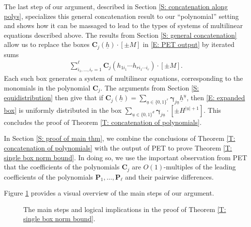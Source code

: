 \documentclass[11pt]{amsart}
\theoremstyle{definition}
\newcommand{\bc}{{\textbf{C}}}
\newcommand{\bp}{{\textbf{P}}}
\newcommand{\bgamma}{{\boldsymbol{\gamma}}}
\newcommand{\uh}{{\underline{h}}}
\newcommand{\uu}{{\underline{u}}}
\begin{document}
The last step of our argument, described in Section \ref{S: concatenation along polys}, specializes this general concatenation result to our ``polynomial'' setting and shows how it can be massaged to lead to the types of systems of multilinear equations described above. The results from Section \ref{S: general concatenation} allow us to replace the boxes $\bc_j(\uh)\cdot[\pm M]$ in \eqref{E: PET output} by iterated sums
\begin{align}\label{E: expanded box}
    \sum_{i_1, \ldots, i_r = 1}^\ell \bc_j(h_{1i_1}\cdots h_{ri_1\cdots i_r})\cdot[\pm M].
\end{align}
Each such box generates a system of multilinear equations, corresponding to the monomials in the polynomial $\bc_j$. The arguments from Section \ref{S: equidistribution} then give that if $\bc_j(\uh)= \sum\limits_{\uu\in\{0,1\}^r} \bgamma_{j\uu}\uh^\uu$, then \eqref{E: expanded box} is uniformly distributed in the box $\sum\limits_{\uu\in\{0,1\}^d}\bgamma_{j\uu}\cdot [\pm H^{|\uu|+1}]$. This concludes the proof of Theorem \ref{T: concatenation of polynomials}. 

In Section \ref{S: proof of main thm}, we combine the conclusions of Theorem \ref{T: concatenation of polynomials} with the output of PET to prove Theorem \ref{T: single box norm bound}. In doing so, we use the important observation from PET that the coefficients of the polynomials $\bc_j$ are $O(1)$-multiples of the leading coefficients of the polynomials $\bp_1, \ldots, \bp_\ell$ and their pairwise differences.

Figure \ref{fig:flowchart} provides a visual overview of the main steps of our argument.

\begin{figure}[ht]
  \centering
{}

    \caption{The main steps and logical implications in the proof of Theorem \ref{T: single box norm bound}.}\label{fig:flowchart}
\end{figure}
\end{document}
